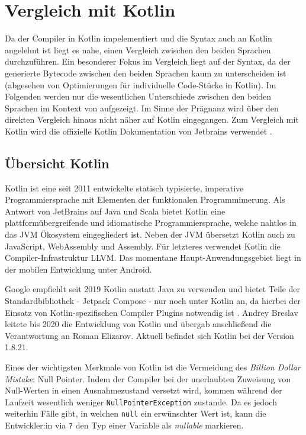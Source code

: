 \chapter{Vergleich mit Kotlin}
\label{cha:comparison}

Da der \toya Compiler in Kotlin impelementiert und die Syntax auch an Kotlin angelehnt ist liegt es nahe, einen Vergleich zwischen den beiden Sprachen durchzuführen. Ein besonderer Fokus im Vergleich liegt auf der Syntax, da der generierte Bytecode zwischen den beiden Sprachen kaum zu unterscheiden ist (abgesehen von Optimierungen für individuelle Code-Stücke in Kotlin). Im Folgenden werden nur die wesentlichen Unterschiede zwischen den beiden Sprachen im Kontext von \toya aufgezeigt. Im Sinne der Prägnanz wird über den direkten Vergleich hinaus nicht näher auf Kotlin eingegangen. Zum Vergleich mit Kotlin wird die offizielle Kotlin Dokumentation von Jetbrains verwendet \parencite{kotlindocs}.

\section{Übersicht Kotlin}
Kotlin ist eine seit 2011 entwickelte statisch typisierte, imperative Programmiersprache mit Elementen der funktionalen Programmimerung. Als Antwort von JetBrains auf Java und Scala bietet Kotlin eine plattformübergreifende und idiomatische Programmiersprache, welche nahtlos in das JVM Ökosystem eingegliedert ist. Neben der JVM übersetzt Kotlin auch zu JavaScript, WebAssembly und Assembly. Für letzteres verwendet Kotlin die Compiler-Infrastruktur LLVM. Das momentane Haupt-Anwendungsgebiet liegt in der mobilen Entwicklung unter Android.

Google empfiehlt seit 2019 Kotlin anstatt Java zu verwenden und bietet Teile der Standardbibliothek - Jetpack Compose - nur noch unter Kotlin an, da hierbei der Einsatz von Kotlin-spezifischen Compiler Plugins notwendig ist \parencite{kotlinfirst}. Andrey Breslav leitete bis 2020 die Entwicklung von Kotlin und übergab anschließend die Verantwortung an Roman Elizarov. Aktuell befindet sich Kotlin bei der Version 1.8.21.

Eines der wichtigsten Merkmale von Kotlin ist die Vermeidung des \textit{Billion Dollar Mistake}: Null Pointer. Indem der Compiler bei der unerlaubten Zuweisung von Null-Werten in einen Ausnahmezustand versetzt wird, kommen während der Laufzeit wesentlich weniger \texttt{NullPointerException} zustande. Da es jedoch weiterhin Fälle gibt, in welchen \texttt{null} ein erwünschter Wert ist, kann die Entwickler:in via \texttt{?} den Typ einer Variable als \textit{nullable} markieren.

